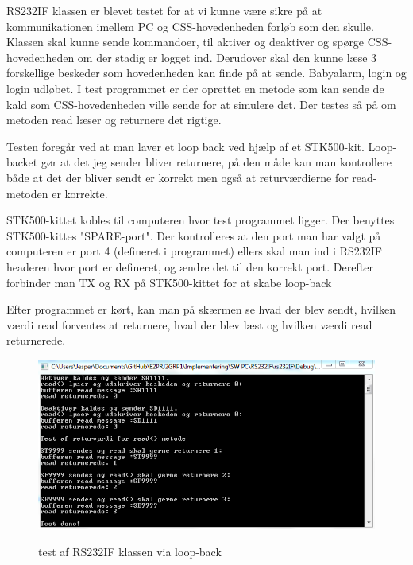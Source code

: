 
RS232IF klassen er blevet testet for at vi kunne være sikre på at kommunikationen imellem PC og CSS-hovedenheden forløb som den skulle. Klassen skal kunne sende kommandoer, til aktiver og deaktiver og spørge CSS-hovedenheden om der stadig er logget ind. Derudover skal den kunne læse 3 forskellige beskeder som hovedenheden kan finde på at sende. Babyalarm, login og login udløbet. I test programmet er der oprettet en metode som kan sende de kald som CSS-hovedenheden ville sende for at simulere det. Der testes så på om metoden read læser og returnere det rigtige. 

\medskip

Testen foregår ved at man laver et loop back ved hjælp af et STK500-kit. Loop-backet gør at det jeg sender bliver returnere, på den måde kan man kontrollere både at det der bliver sendt er korrekt men også at returværdierne for read-metoden er korrekte. 

\medskip

STK500-kittet kobles til computeren hvor test programmet ligger. Der benyttes STK500-kittes "SPARE-port". Der kontrolleres at den port man har valgt på computeren er port 4 (defineret i programmet) ellers skal man ind i RS232IF headeren hvor port er defineret, og ændre det til den korrekt port. Derefter forbinder man TX og RX på STK500-kittet for at skabe loop-back
 
 \medskip
Efter programmet er kørt, kan man på skærmen se hvad der blev sendt, hvilken værdi read forventes at returnere, hvad der blev læst og hvilken værdi read returnerede.

\begin{figure}[!htb]
     {\includegraphics[width=\textwidth]{billeder/SWTest/RS232IF_pc_test}}
     \caption{test af RS232IF klassen via loop-back}
     \label{fig:RS232IF klasse test}
\end{figure}